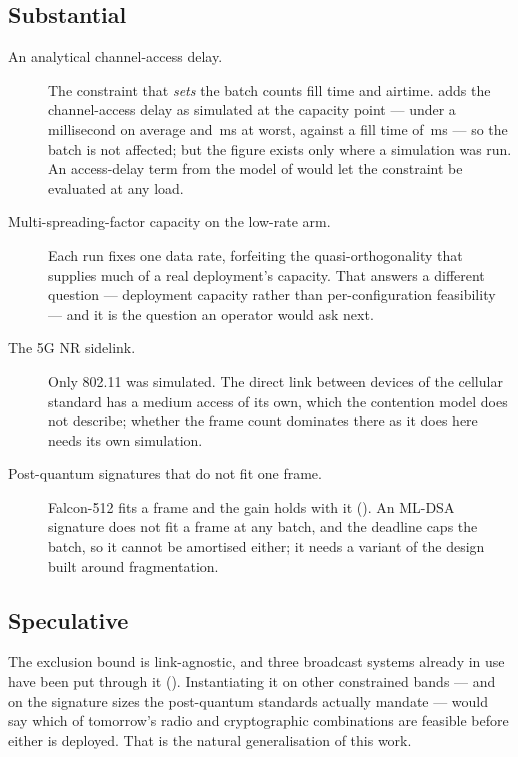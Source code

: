 \subsection{Substantial}

\begin{description}
\item[An analytical channel-access delay.] The constraint that \emph{sets} the batch counts fill
time and airtime.  adds the channel-access delay as simulated at the
capacity point --- under a millisecond on average and \frChMax\,ms at worst, against a fill time
of \frFill\,ms --- so the batch is not affected; but the figure exists only where a simulation
was run. An access-delay term from the model of  would let the constraint be
evaluated at any load.

\item[Multi-spreading-factor capacity on the low-rate arm.] Each run fixes one data rate,
forfeiting the quasi-orthogonality that supplies much of a real deployment's capacity. That answers
a different question --- deployment capacity rather than per-configuration feasibility --- and it
is the question an operator would ask next.

\item[The 5G NR sidelink.] Only 802.11 was simulated. The direct link between devices of the
cellular standard has a medium access of its own, which the contention model does not describe;
whether the frame count dominates there as it does here needs its own simulation.

\item[Post-quantum signatures that do not fit one frame.] Falcon-512 fits a frame and the gain
holds with it (). An ML-DSA signature does not fit a frame at any batch, and the
deadline caps the batch, so it cannot be amortised either; it needs a variant of the design built
around fragmentation.
\end{description}

\subsection{Speculative}

The exclusion bound is link-agnostic, and three broadcast systems already in use have been put
through it (). Instantiating it on other constrained bands --- and on the
signature sizes the post-quantum standards actually mandate --- would say which of tomorrow's radio
and cryptographic combinations are feasible before either is deployed. That is the natural
generalisation of this work.

